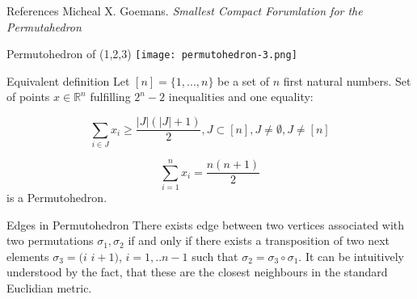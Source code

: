 \documentclass[a0paper,portrait]{xebaposter}
\begin{document}
\begin{poster}
\begin{posterbox}[name=refs, column=2,above=bottom]{References}
    Micheal X. Goemans. \emph{Smallest Compact Forumlation for the Permutahedron}
\end{posterbox}

\begin{posterbox}[name=permutation3, column=0, below=Schur]{Permutohedron of (1,2,3) }
\texttt{[image: permutohedron-3.png]}
\end{posterbox}

\begin{posterbox}[name=eqdef,column=2,row=0]{Equivalent definition }
Let $[n] = \{1,...,n\}$ be a set of $n$ first natural numbers.
Set of points $x \in \mathbb{R}^n$ fulfilling $2^n - 2$ inequalities and one equality:

$$ \sum_{i \in J} x_i \geq \frac{|J|(|J|+1)}{2}, J \subset [n], J \neq \emptyset, J \neq  [n] $$

$$ \sum_{i=1}^{n} x_i = \frac{n(n+1)}{2} $$
is a Permutohedron.
\end{posterbox}
\begin{posterbox}[name=edges,column=2,row=1,below=eqdef]{Edges in Permutohedron}
There exists edge between
two vertices associated with two permutations $\sigma_1, \sigma_2$ if and only if there exists a transposition of two next elements  $\sigma_3 = (i $ $ i+1)$, $i=1,..n-1$ such that  $ \sigma_2 = \sigma_3 \circ \sigma_1$.
\newline 
It can be intuitively understood by the fact, that these are the closest neighbours in the standard Euclidian metric. 
\end{posterbox}


\end{poster}
\end{document}
